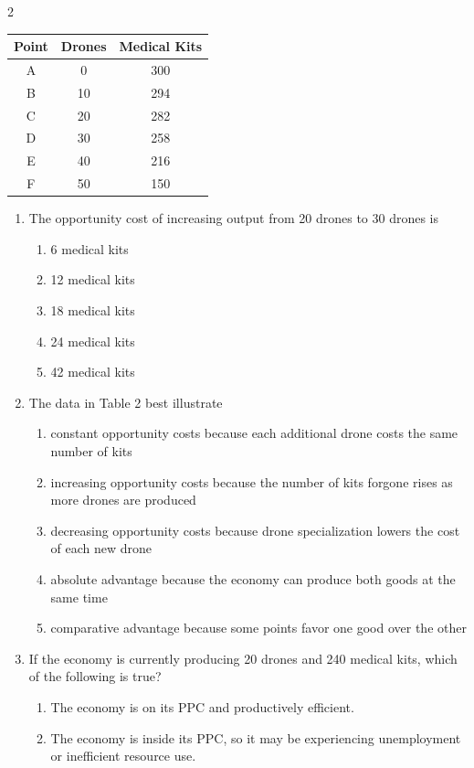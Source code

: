 \documentclass[10pt]{article}
\newenvironment{choiceslist}
  {\begin{enumerate}[label=(\Alph*), leftmargin=1.6em, itemsep=0.12em, topsep=0.18em, parsep=0pt]}
  {\end{enumerate}}
\newenvironment{stimulus}
  {\begin{center}\begin{minipage}{0.96\columnwidth}\footnotesize\itshape\setlength{\tabcolsep}{3pt}\renewcommand{\arraystretch}{0.96}}
  {\end{minipage}\end{center}}
\begin{document}
\begin{multicols*}{2}
\begin{stimulus}
\begin{center}
\begin{tabular}{ccc}
\toprule
Point & Drones & Medical Kits \\
\midrule
A & 0 & 300 \\
B & 10 & 294 \\
C & 20 & 282 \\
D & 30 & 258 \\
E & 40 & 216 \\
F & 50 & 150 \\
\bottomrule
\end{tabular}
\end{center}
\end{stimulus}
\begin{enumerate}[resume*=apq, leftmargin=*, itemsep=0.85em, topsep=0.2em, parsep=0pt]
\item The opportunity cost of increasing output from 20 drones to 30 drones is
\begin{choiceslist}
\item 6 medical kits
\item 12 medical kits
\item 18 medical kits
\item 24 medical kits
\item 42 medical kits
\end{choiceslist}
\item The data in Table 2 best illustrate
\begin{choiceslist}
\item constant opportunity costs because each additional drone costs the same number of kits
\item increasing opportunity costs because the number of kits forgone rises as more drones are produced
\item decreasing opportunity costs because drone specialization lowers the cost of each new drone
\item absolute advantage because the economy can produce both goods at the same time
\item comparative advantage because some points favor one good over the other
\end{choiceslist}
\item If the economy is currently producing 20 drones and 240 medical kits, which of the following is true?
\begin{choiceslist}
\item The economy is on its PPC and productively efficient.
\item The economy is inside its PPC, so it may be experiencing unemployment or inefficient resource use.

\end{choiceslist}
\end{enumerate}
\end{multicols*}
\end{document}

